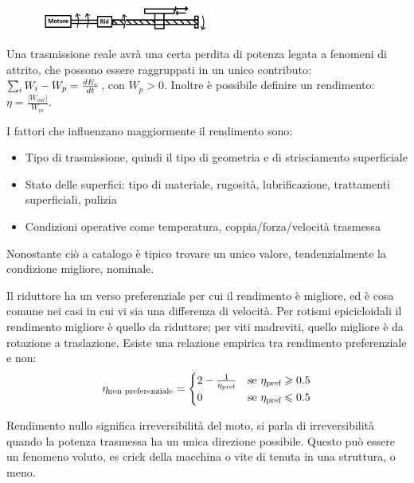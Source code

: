 \begin{figure}[h]
    \centering
    \includegraphics[width=0.5\textwidth]{Immagini/mrc_vite_madrevite.png}
\end{figure}


Una trasmissione reale avrà una certa perdita di potenza legata a fenomeni di attrito, che possono essere raggruppati in un unico contributo: $\sum_i W_i - W_p = \frac{dE_c}{dt}$, con $W_p>0$.
Inoltre è possibile definire un rendimento: $\eta=\frac{|W_{out}|}{W_{in}}$.

I fattori che influenzano maggiormente il rendimento sono:
\begin{itemize}
    \item Tipo di trasmissione, quindi il tipo di geometria e di strisciamento superficiale
    \item Stato delle superfici: tipo di materiale, rugosità, lubrificazione, trattamenti superficiali, pulizia
    \item Condizioni operative come temperatura, coppia/forza/velocità trasmessa
\end{itemize}
Nonostante ciò a catalogo è tipico trovare un unico valore, tendenzialmente la condizione migliore, nominale.

Il riduttore ha un verso preferenziale per cui il rendimento è migliore, ed è cosa comune nei casi in cui vi sia una differenza di velocità.
Per rotismi epicicloidali il rendimento migliore è quello da riduttore; per viti madreviti, quello migliore è da rotazione a traslazione.
Esiste una relazione empirica tra rendimento preferenziale e non:
\[
\eta_\textup{non preferenziale} = 
\begin{cases} 
    2 - \frac{1}{\eta_\textup{pref}} & \text{se } \eta_\textup{pref} \geqslant 0.5 \\
    0 & \text{se } \eta_\textup{pref} \leqslant 0.5
\end{cases}
\]

Rendimento nullo significa irreversibilità del moto, si parla di irreversibilità quando la potenza trasmessa ha un unica direzione possibile. Questo può essere un fenomeno voluto, es crick della macchina o vite di tenuta in una struttura, o meno.

